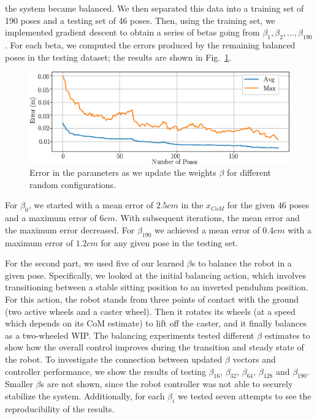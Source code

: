 \documentclass[letterpaper, 10 pt, conference]{ieeeconf}
\begin{document}
the system became balanced.  We then separated this data into a training set of
190 poses and a testing set of 46 poses.  Then, using the training set, we
implemented gradient descent to obtain a series of betas going from $\beta_1,
\beta_2, \dots, \beta_{190}$. For each beta, we computed the errors produced by
the remaining balanced poses in the testing dataset; the results are shown in
Fig.~\ref{fig:Error_hardware}.
\begin{figure}
\centering
\includegraphics[width=0.9\columnwidth]{figs/TestingHardware.eps}
\vspace{-0.2cm}
\caption{\label{fig:Error_hardware} Error in the parameters as we update the
weights $\beta$ for different random configurations.}
\end{figure}
For $\beta_0$, we started with a mean error of $2.5 cm$ in the $x_{CoM}$ for the
given $46$ poses and a maximum error of $6 cm$. With subsequent iterations, the
mean error and the maximum error decreased. For $\beta_{190}$ we achieved a mean
error of $0.4 cm$ with a maximum error of $1.2 cm$ for any given pose in the
testing set.

For the second part, we used five of our learned $\beta$s to balance the robot
in a given pose.  Specifically, we looked at the initial balancing action, which
involves transitioning between a stable sitting position to an inverted pendulum
position. For this action, the robot stands from three points of contact with
the ground (two active wheels and a caster wheel). Then it rotates its wheels
(at a speed which depends on its \ac{CoM} estimate) to lift off the caster, and
it finally balances as a two-wheeled \ac{WIP}.
The balancing experiments tested different $\beta$ estimates to show how the
overall control improves during the transition and steady state of the robot.
To investigate the connection between updated $\beta$ vectors and controller
performance, we show the results of testing $\beta_{16}$, $\beta_{32}$,
$\beta_{64}$, $\beta_{128}$ and $\beta_{190}$.  Smaller $\beta$s are not shown,
since the robot controller was not able to securely stabilize the system.
Additionally, for each $\beta_i$ we tested seven attempts to see the
reproducibility of the results.
\end{document}
